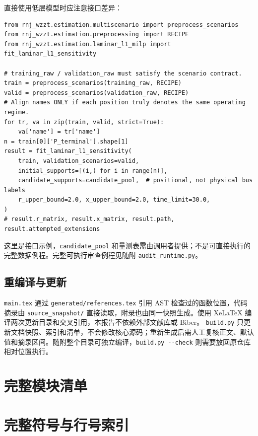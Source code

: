 \documentclass[UTF8,11pt,a4paper,fontset=windows]{ctexart}
\begin{document}
直接使用低层模型时应注意接口差异：
\begin{Verbatim}[fontsize=\small,breaklines=true,frame=leftline]
from rnj_wzzt.estimation.multiscenario import preprocess_scenarios
from rnj_wzzt.estimation.preprocessing import RECIPE
from rnj_wzzt.estimation.laminar_l1_milp import fit_laminar_l1_sensitivity

# training_raw / validation_raw must satisfy the scenario contract.
train = preprocess_scenarios(training_raw, RECIPE)
valid = preprocess_scenarios(validation_raw, RECIPE)
# Align names ONLY if each position truly denotes the same operating regime.
for tr, va in zip(train, valid, strict=True):
    va['name'] = tr['name']
n = train[0]['P_terminal'].shape[1]
result = fit_laminar_l1_sensitivity(
    train, validation_scenarios=valid,
    initial_supports=[(i,) for i in range(n)],
    candidate_supports=candidate_pool,  # positional, not physical bus labels
    r_upper_bound=2.0, x_upper_bound=2.0, time_limit=30.0,
)
# result.r_matrix, result.x_matrix, result.path, result.attempted_extensions
\end{Verbatim}
这里是接口示例，\nolinkurl{candidate_pool} 和量测表需由调用者提供；不是可直接执行的完整数据例程。完整可执行审查例程见随附 \nolinkurl{audit_runtime.py}。

\subsection{重编译与更新}
\nolinkurl{main.tex} 通过 \nolinkurl{generated/references.tex} 引用 AST 检查过的函数位置，代码摘录由 \nolinkurl{source_snapshot/} 直接读取，附录也由同一快照生成。使用 XeLaTeX 编译两次更新目录和交叉引用，本报告不依赖外部文献库或 Biber。
\nolinkurl{build.py} 只更新文档快照、索引和清单，不会修改核心源码；重新生成后需人工复核正文、默认值和摘录区间。随附整个目录可独立编译，\nolinkurl{build.py --check} 则需要放回原仓库相对位置执行。

\appendix
\clearpage
\section{完整模块清单}
\small

\normalsize

\section{完整符号与行号索引}
\small

\normalsize
\end{document}
